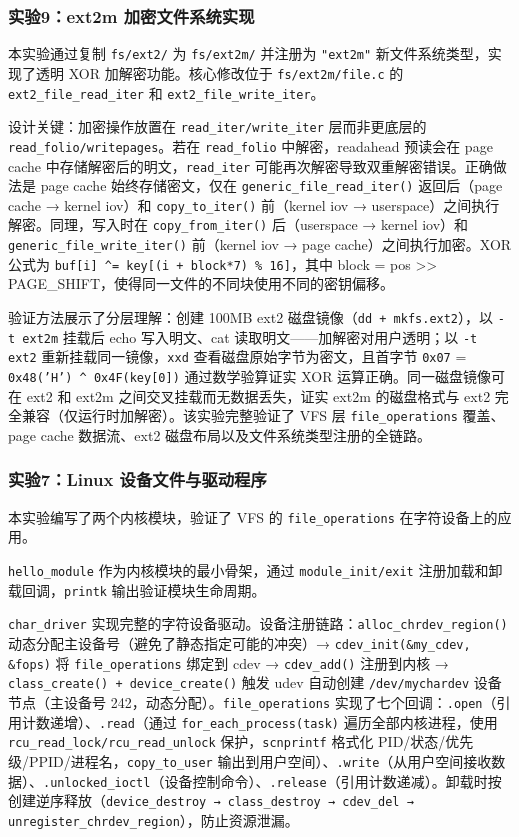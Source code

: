 \documentclass[a4paper]{article}
\begin{document}
\subsubsection{实验9：ext2m 加密文件系统实现}

本实验通过复制 \texttt{fs/ext2/} 为 \texttt{fs/ext2m/} 并注册为 \texttt{"ext2m"} 新文件系统类型，实现了透明 XOR 加解密功能。核心修改位于 \texttt{fs/ext2m/file.c} 的 \texttt{ext2\_file\_read\_iter} 和 \texttt{ext2\_file\_write\_iter}。

设计关键：加密操作放置在 \texttt{read\_iter/write\_iter} 层而非更底层的 \texttt{read\_folio/writepages}。若在 \texttt{read\_folio} 中解密，readahead 预读会在 page cache 中存储解密后的明文，\texttt{read\_iter} 可能再次解密导致双重解密错误。正确做法是 page cache 始终存储密文，仅在 \texttt{generic\_file\_read\_iter()} 返回后（page cache → kernel iov）和 \texttt{copy\_to\_iter()} 前（kernel iov → userspace）之间执行解密。同理，写入时在 \texttt{copy\_from\_iter()} 后（userspace → kernel iov）和 \texttt{generic\_file\_write\_iter()} 前（kernel iov → page cache）之间执行加密。XOR 公式为 \texttt{buf[i] \^{}= key[(i + block*7) \% 16]}，其中 block = pos >> PAGE\_SHIFT，使得同一文件的不同块使用不同的密钥偏移。

验证方法展示了分层理解：创建 100MB ext2 磁盘镜像（\texttt{dd + mkfs.ext2}），以 \texttt{-t ext2m} 挂载后 echo 写入明文、cat 读取明文——加解密对用户透明；以 \texttt{-t ext2} 重新挂载同一镜像，\texttt{xxd} 查看磁盘原始字节为密文，且首字节 \texttt{0x07} = \texttt{0x48('H') \^{} 0x4F(key[0])} 通过数学验算证实 XOR 运算正确。同一磁盘镜像可在 ext2 和 ext2m 之间交叉挂载而无数据丢失，证实 ext2m 的磁盘格式与 ext2 完全兼容（仅运行时加解密）。该实验完整验证了 VFS 层 \texttt{file\_operations} 覆盖、page cache 数据流、ext2 磁盘布局以及文件系统类型注册的全链路。

\subsubsection{实验7：Linux 设备文件与驱动程序}

本实验编写了两个内核模块，验证了 VFS 的 \texttt{file\_operations} 在字符设备上的应用。

\texttt{hello\_module} 作为内核模块的最小骨架，通过 \texttt{module\_init/exit} 注册加载和卸载回调，\texttt{printk} 输出验证模块生命周期。

\texttt{char\_driver} 实现完整的字符设备驱动。设备注册链路：\texttt{alloc\_chrdev\_region()} 动态分配主设备号（避免了静态指定可能的冲突）→ \texttt{cdev\_init(\&my\_cdev, \&fops)} 将 \texttt{file\_operations} 绑定到 cdev → \texttt{cdev\_add()} 注册到内核 → \texttt{class\_create() + device\_create()} 触发 udev 自动创建 \texttt{/dev/mychardev} 设备节点（主设备号 242，动态分配）。\texttt{file\_operations} 实现了七个回调：\texttt{.open}（引用计数递增）、\texttt{.read}（通过 \texttt{for\_each\_process(task)} 遍历全部内核进程，使用 \texttt{rcu\_read\_lock/rcu\_read\_unlock} 保护，\texttt{scnprintf} 格式化 PID/状态/优先级/PPID/进程名，\texttt{copy\_to\_user} 输出到用户空间）、\texttt{.write}（从用户空间接收数据）、\texttt{.unlocked\_ioctl}（设备控制命令）、\texttt{.release}（引用计数递减）。卸载时按创建逆序释放（\texttt{device\_destroy → class\_destroy → cdev\_del → unregister\_chrdev\_region}），防止资源泄漏。
\end{document}
